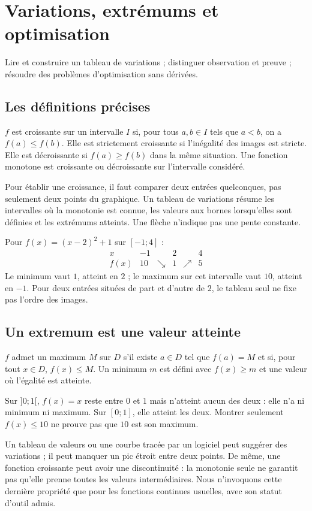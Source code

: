 \documentclass[../cours_2de.tex]{subfiles}
\begin{document}
\setcounter{chapter}{15}
\chapter{Variations, extrémums et optimisation}
\label{sec:ch16}
\begin{objectif}
Lire et construire un tableau de variations ; distinguer observation et preuve ; résoudre des problèmes d'optimisation sans dérivées.
\end{objectif}
\section{Les définitions précises}
\begin{definition}
$f$ est croissante sur un intervalle $I$ si, pour tous $a,b\in I$ tels que $a<b$, on a $f(a)\leq f(b)$. Elle est strictement croissante si l'inégalité des images est stricte.
Elle est décroissante si $f(a)\geq f(b)$ dans la même situation. Une fonction monotone est croissante ou décroissante sur l'intervalle considéré.
\end{definition}
Pour établir une croissance, il faut comparer deux entrées quelconques, pas seulement deux points du graphique.
Un tableau de variations résume les intervalles où la monotonie est connue, les valeurs aux bornes lorsqu'elles sont définies et les extrémums atteints. Une flèche n'indique pas une pente constante.
\begin{exemple}
Pour $f(x)=(x-2)^2+1$ sur $[-1;4]$ :
\[
\begin{array}{c|ccccc}
x&-1&&2&&4\\\hline
f(x)&10&\searrow&1&\nearrow&5
\end{array}
\]
Le minimum vaut $1$, atteint en $2$ ; le maximum sur cet intervalle vaut $10$, atteint en $-1$. Pour deux entrées situées de part et d'autre de $2$, le tableau seul ne fixe pas l'ordre des images.
\end{exemple}
\section{Un extremum est une valeur atteinte}
\begin{definition}
$f$ admet un maximum $M$ sur $D$ s'il existe $a\in D$ tel que $f(a)=M$ et si, pour tout $x\in D$, $f(x)\leq M$.
Un minimum $m$ est défini avec $f(x)\geq m$ et une valeur où l'égalité est atteinte.
\end{definition}
\begin{exemple}
Sur $]0;1[$, $f(x)=x$ reste entre $0$ et $1$ mais n'atteint aucun des deux : elle n'a ni minimum ni maximum. Sur $[0;1]$, elle atteint les deux.
Montrer seulement $f(x)\leq10$ ne prouve pas que $10$ est son maximum.
\end{exemple}
Un tableau de valeurs ou une courbe tracée par un logiciel peut suggérer des variations ; il peut manquer un pic étroit entre deux points.
De même, une fonction croissante peut avoir une discontinuité : la monotonie seule ne garantit pas qu'elle prenne toutes les valeurs intermédiaires. Nous n'invoquons cette dernière propriété que pour les fonctions continues usuelles, avec son statut d'outil admis.
\end{document}

